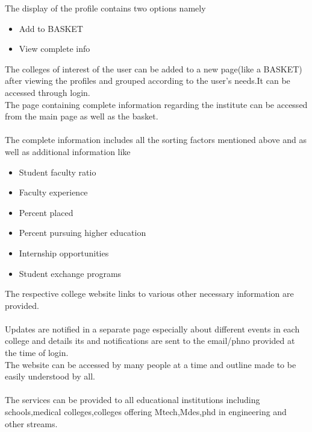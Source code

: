 \documentclass[11pt]{article}
\begin{document}
\begin{large}
The display of the profile contains two options namely
\begin{itemize}
\item Add to BASKET
\item View complete info
\end{itemize}
The colleges of interest of the user can be added to a new page(like a BASKET) after viewing the profiles and grouped according to the user's needs.It can be accessed through login.
\\ The page containing complete information regarding the institute can be accessed from the main page as well as the basket.
\\ \\The complete information includes all the sorting factors mentioned above and as well as additional information like
\begin{itemize}
\item Student faculty ratio
\item Faculty experience
\item Percent placed
\item Percent pursuing higher education
\item Internship opportunities
\item Student exchange programs

\end{itemize}
   
 The respective college website links to various other necessary information are provided.
\\ \\Updates are notified in a separate page especially  about different events in each college and details its and notifications are sent to the email/phno provided at the time of login. 
\\The website can be accessed by many people at a time and outline made to be easily understood by all.
\\ \\The services can be provided to all educational institutions including schools,medical colleges,colleges offering Mtech,Mdes,phd in engineering and other streams.\\ \\

                               \author{\textit{\textbf{COE16B013}}}   
                               \\ \author{\textit{\textbf{COE16B014}}}
                               \\ \author{\textit{\textbf{COE16B022}}}
                                

\end{large}
\end{document}
